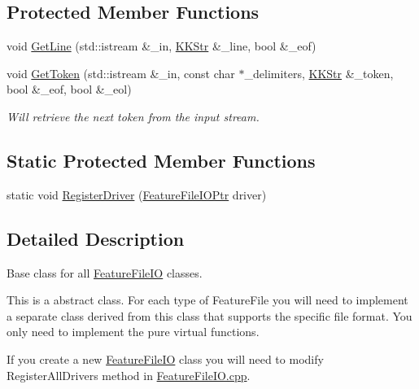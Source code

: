 \subsection*{Protected Member Functions}
\begin{DoxyCompactItemize}
\item 
void \hyperlink{class_k_k_m_l_l_1_1_feature_file_i_o_a61ca11485d2c14368c1019bfcc53ab16}{Get\+Line} (std\+::istream \&\+\_\+in, \hyperlink{class_k_k_b_1_1_k_k_str}{K\+K\+Str} \&\+\_\+line, bool \&\+\_\+eof)
\item 
void \hyperlink{class_k_k_m_l_l_1_1_feature_file_i_o_ae79ac82b32e63fa7e7d96c833b5631f2}{Get\+Token} (std\+::istream \&\+\_\+in, const char $\ast$\+\_\+delimiters, \hyperlink{class_k_k_b_1_1_k_k_str}{K\+K\+Str} \&\+\_\+token, bool \&\+\_\+eof, bool \&\+\_\+eol)
\begin{DoxyCompactList}\small\item\em Will retrieve the next token from the input stream. \end{DoxyCompactList}\end{DoxyCompactItemize}
\subsection*{Static Protected Member Functions}
\begin{DoxyCompactItemize}
\item 
static void \hyperlink{class_k_k_m_l_l_1_1_feature_file_i_o_a7fe96188c22f2a224da1963810c17fcc}{Register\+Driver} (\hyperlink{class_k_k_m_l_l_1_1_feature_file_i_o_a12e6dd6bcaf2576238622568d92f981f}{Feature\+File\+I\+O\+Ptr} driver)
\end{DoxyCompactItemize}


\subsection{Detailed Description}
Base class for all \hyperlink{class_k_k_m_l_l_1_1_feature_file_i_o}{Feature\+File\+IO} classes. 

This is a abstract class. For each type of Feature\+File you will need to implement a separate class derived from this class that supports the specific file format. You only need to implement the pure virtual functions.

If you create a new \hyperlink{class_k_k_m_l_l_1_1_feature_file_i_o}{Feature\+File\+IO} class you will need to modify \textquotesingle{}Register\+All\+Drivers\textquotesingle{} method in \hyperlink{_feature_file_i_o_8cpp}{Feature\+File\+I\+O.\+cpp}. 

